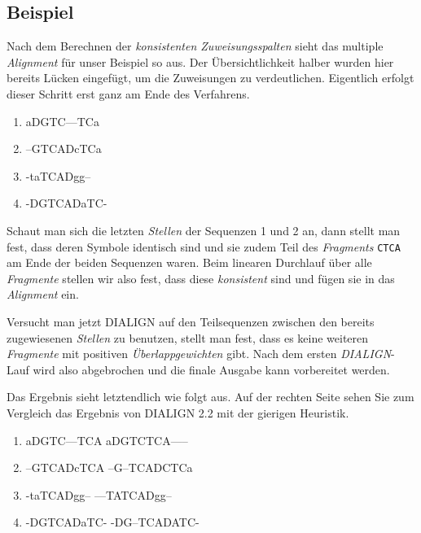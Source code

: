 \subsection{Beispiel}

Nach dem Berechnen der \emph{konsistenten Zuweisungsspalten} sieht das multiple \emph{Alignment} für unser Beispiel so aus. Der Übersichtlichkeit halber wurden hier bereits Lücken eingefügt, um die Zuweisungen zu verdeutlichen. Eigentlich erfolgt dieser Schritt erst ganz am Ende des Verfahrens.

\ttfamily
\begin{enumerate}[topsep=0pt,itemsep=-1ex,partopsep=1ex,parsep=1ex]
	\item aDGTC---TCa
	\item --GTCADcTCa
	\item -taTCADgg--
	\item -DGTCADaTC-
\end{enumerate}
\normalfont

Schaut man sich die letzten \emph{Stellen} der Sequenzen 1 und 2 an, dann stellt man fest, dass deren Symbole identisch sind und sie zudem Teil des \emph{Fragments} \texttt{CTCA} am Ende der beiden Sequenzen waren. Beim linearen Durchlauf über alle \emph{Fragmente} stellen wir also fest, dass diese \emph{konsistent} sind und fügen sie in das \emph{Alignment} ein.

Versucht man jetzt DIALIGN auf den Teilsequenzen zwischen den bereits zugewiesenen \emph{Stellen} zu benutzen, stellt man fest, dass es keine weiteren \emph{Fragmente} mit positiven \emph{Überlappgewichten} gibt. Nach dem ersten \emph{DIALIGN}-Lauf wird also abgebrochen und die finale Ausgabe kann vorbereitet werden.

Das Ergebnis sieht letztendlich wie folgt aus. Auf der rechten Seite sehen Sie zum Vergleich das Ergebnis von DIALIGN 2.2 mit der gierigen Heuristik.

\ttfamily
\begin{enumerate}[topsep=0pt,itemsep=-1ex,partopsep=1ex,parsep=1ex]
	\item aDGTC---TCA \hspace{3cm} aDGTCTCA-----
	\item --GTCADcTCA \hspace{3cm} --G--TCADCTCa
	\item -taTCADgg-- \hspace{3cm} ---TATCADgg--
	\item -DGTCADaTC- \hspace{3cm} -DG--TCADATC-
\end{enumerate}
\normalfont

